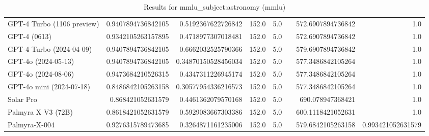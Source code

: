 \begin{table}[htp]
{\begin{tabular}{lrrrrrrr}
GPT-4 Turbo (1106 preview) & 0.9407894736842105 & 0.5192367622726842 & 152.0 & 5.0 &  & 572.6907894736842 & 1.0 \\
GPT-4 (0613) & 0.9342105263157895 & 0.4718977307018481 & 152.0 & 5.0 &  & 572.6907894736842 & 1.0 \\
GPT-4 Turbo (2024-04-09) & 0.9407894736842105 & 0.6662032525790366 & 152.0 & 5.0 &  & 579.6907894736842 & 1.0 \\
GPT-4o (2024-05-13) & 0.9407894736842105 & 0.34870150528456034 & 152.0 & 5.0 &  & 577.3486842105264 & 1.0 \\
GPT-4o (2024-08-06) & 0.9473684210526315 & 0.4347311226945174 & 152.0 & 5.0 &  & 577.3486842105264 & 1.0 \\
GPT-4o mini (2024-07-18) & 0.8486842105263158 & 0.30577954336216573 & 152.0 & 5.0 &  & 577.3486842105264 & 1.0 \\
Solar Pro & 0.868421052631579 & 0.4461362079570168 & 152.0 & 5.0 &  & 690.078947368421 & 1.0 \\
Palmyra X V3 (72B) & 0.8618421052631579 & 0.5929083667303386 & 152.0 & 5.0 &  & 600.1118421052631 & 1.0 \\
Palmyra-X-004 & 0.9276315789473685 & 0.3264871161235006 & 152.0 & 5.0 &  & 579.6842105263158 & 0.993421052631579 \\
\bottomrule
\end{tabular}}
\caption{Results for mmlu_subject:astronomy (mmlu)}
\label{fig:mmlu_subject:astronomy (mmlu)}
\end{table}
